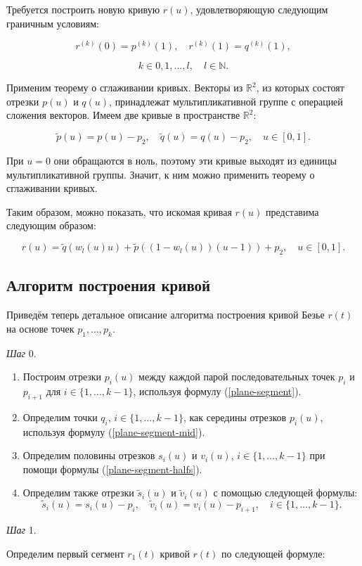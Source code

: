 Требуется построить новую кривую $r(u)$, удовлетворяющую следующим граничным условиям:

$$
r^{(k)}(0)=p^{(k)}(1), \quad r^{(k)}(1)=q^{(k)}(1),
$$

$$
k \in {0,1,\dots,l}, \quad l \in \mathbb{N}.
$$

Применим теорему о сглаживании кривых. Векторы из $\mathbb{R}^2$, из которых состоят отрезки $p(u)$ и $q(u)$,
принадлежат мультипликативной группе с операцией сложения векторов. Имеем две кривые в пространстве $\mathbb{R}^2$:

$$
\tilde p(u)=p(u)-p_2, \quad \tilde q(u)=q(u)-p_2, \quad u \in [0,1].
$$

При $u=0$ они обращаются в ноль, поэтому эти кривые выходят из единицы мультипликативной группы. Значит, к ним можно
применить теорему о сглаживании кривых.

Таким образом, можно показать, что искомая кривая $r(u)$ представима следующим образом:

$$
r(u)=\tilde q(w_l(u)u)+\tilde p((1-w_l(u))(u-1))+p_2, \quad u \in [0,1].
$$

\subsection*{Алгоритм построения кривой}

Приведём теперь детальное описание алгоритма построения кривой Безье $r(t)$ на основе точек $p_1,\dots,p_k$.

\bigskip
\textit{Шаг} 0.

\begin{enumerate}
\item Построим отрезки $p_i(u)$ между каждой парой последовательных точек $p_i$ и $p_{i+1}$ для
$i \in \{1,\dots,k-1\}$, используя формулу (\ref{plane-segment}).
\item Определим точки $q_i$, $i \in \{1,\dots,k-1\}$, как середины отрезков $p_i(u)$, используя формулу
(\ref{plane-segment-mid}).
\item Определим половины отрезков $s_i(u)$ и $v_i(u)$, $i \in \{1,\dots,k-1\}$ при помощи формулы
(\ref{plane-segment-halfs}).
\item Определим также отрезки $\tilde s_i(u)$ и $\tilde v_i(u)$ с помощью следующей формулы:
$$
\tilde s_i(u)=s_i(u)-p_i, \quad \tilde v_i(u)=v_i(u)-p_{i+1}, \quad i \in \{1,\dots,k-1\}.
$$
\end{enumerate}

\bigskip
\textit{Шаг} 1.

Определим первый сегмент $r_1(t)$ кривой $r(t)$ по следующей формуле:


